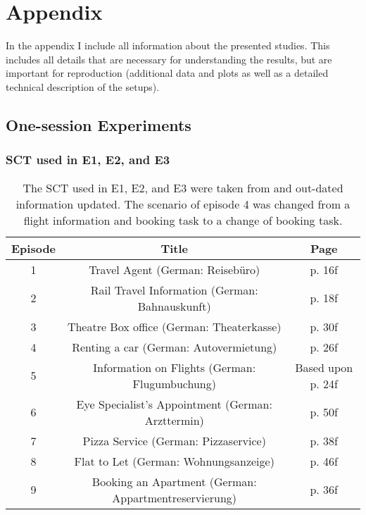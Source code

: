 \chapter{Appendix}\label{chap:appendix}
\begin{chapter-abstract}
In the appendix I include all information about the presented studies.
This includes all details that are necessary for understanding the results, but are important for reproduction (additional data and plots as well as a detailed technical description of the setups).
\end{chapter-abstract}


\section{One-session Experiments}\label{appendix:laboratorySetups}

\subsection{\acs{SCT} used in E1, E2, and E3}
\begin{table}
	\centering
	\begin{tabular}{c|c|c}
	Episode & Title & Page \\
	\hline
	1 & Travel Agent (German: Reisebüro) & p. 16f \\
	2 & Rail Travel Information (German: Bahnauskunft) & p. 18f \\
	3 & Theatre Box office (German: Theaterkasse) & p. 30f \\
	4 & Renting a car (German: Autovermietung) & p. 26f \\
	5 & Information on Flights (German: Flugumbuchung) & Based upon p. 24f \\
	6 & Eye Specialist's Appointment (German: Arzttermin) & p. 50f \\
	7 & Pizza Service (German: Pizzaservice) & p. 38f \\
	8 & Flat to Let (German: Wohnungsanzeige) & p. 46f \\
	9 & Booking an Apartment (German: Appartmentreservierung) & p. 36f \\
	\end{tabular}
	\caption{The \acs{SCT} used in E1, E2, and E3 were taken from \cite{itu-t_p.805:_2007} and out-dated information updated. The scenario of episode 4 was changed from a flight information and booking task to a change of booking task.}
	\label{tab:appendix:labsct}
\end{table}

